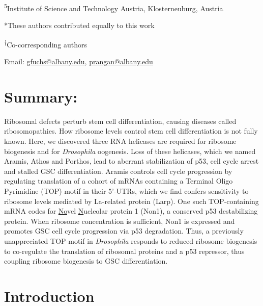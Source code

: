 \documentclass[12pt,oneside]{reedthesis}
\begin{document}
\textsuperscript{5}Institute of Science and Technology Austria, Klosterneuburg, Austria

*These authors contributed equally to this work

\textsuperscript{†}Co-corresponding authors

Email: \href{mailto:gfuchs@albany.edu}{\underline{gfuchs@albany.edu}},
\underline{prangan@albany.edu}

\hypertarget{summary-1}{%
\section{Summary:}\label{summary-1}}

Ribosomal defects perturb stem cell differentiation,
causing diseases called ribosomopathies. How ribosome levels control
stem cell differentiation is not fully known. Here, we discovered three
RNA helicases are required for ribosome biogenesis and for \emph{Drosophila}
oogenesis. Loss of these helicases, which we named Aramis, Athos and
Porthos, lead to aberrant stabilization of p53, cell cycle arrest and
stalled GSC differentiation. Aramis controls cell cycle progression by
regulating translation of a cohort of mRNAs containing a Terminal Oligo
Pyrimidine (TOP) motif in their 5'-UTRs, which we find confers
sensitivity to ribosome levels mediated by La-related protein (Larp).
One such TOP-containing mRNA codes for \underline{No}vel
\underline{N}ucleolar protein 1 (Non1), a conserved p53 destabilizing
protein. When ribosome concentration is sufficient, Non1 is expressed
and promotes GSC cell cycle progression via p53 degradation. Thus, a
previously unappreciated TOP-motif in \emph{Drosophila} responds to reduced
ribosome biogenesis to co-regulate the translation of ribosomal proteins
and a p53 repressor, thus coupling ribosome biogenesis to GSC
differentiation.

\hypertarget{introduction-2}{%
\section{Introduction}\label{introduction-2}}
\end{document}
